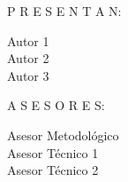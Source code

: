 \begin{center}


\vspace*{1.5cm}%
\begin{minipage}{0.46\textwidth}													%
\begin{flushleft} \large															%
P R E S E N T A N:\\	

\vspace*{.4cm}%

Autor 1\\     %
Autor 2\\
Autor 3\\
\space
            \vspace*{1.2cm}	
\end{flushleft}																		%
\end{minipage}		
\begin{minipage}{0.52\textwidth}		
\vspace{-0.6cm}											%
\begin{flushright} \large															%
A S E S O R E S: \\		
\vspace*{.4cm}%

Asesor Metodológico\\    %
Asesor Técnico 1\\       %
Asesor Técnico 2\\       %



\end{flushright}
\end{minipage}
\end{center}
